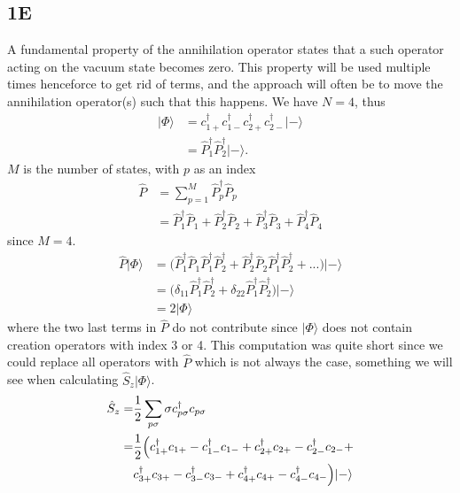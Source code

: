 \documentclass[norsk,a4paper,12pt]{article}
\begin{document}
\subsection*{1E}
A fundamental property of the annihilation operator states that a such operator acting on the vacuum state becomes zero. This property will be used multiple times henceforce to get rid of terms, and the approach will often be to move the annihilation operator(s) such that this happens. 
We have $N=4$, thus 
\begin{align}
|\Phi\rangle&=c_{1+}^{\dagger}c_{1-}^{\dagger}c_{2+}^{\dagger}c_{2-}^{\dagger}|-\rangle\\
&=\hat{P}_1^{\dagger}\hat{P}_2^{\dagger}|-\rangle.
\end{align}
$M$ is the number of states, with $p$ as an index
\begin{align}
\hat{P}&=\sum_{p=1}^M\hat{P}_p^{\dagger}\hat{P}_p\\
&=\hat{P}_1^{\dagger}\hat{P}_1+\hat{P}_2^{\dagger}\hat{P}_2+\hat{P}_3^{\dagger}\hat{P}_3+\hat{P}_4^{\dagger}\hat{P}_4
\end{align}
since $M=4$. 
\begin{align}
\hat{P}|\Phi\rangle&=\Big(\hat{P}_1^{\dagger}\hat{P}_1\hat{P}_1^{\dagger}\hat{P}_2^{\dagger}+\hat{P}_2^{\dagger}\hat{P}_2\hat{P}_1^{\dagger}\hat{P}_2^{\dagger}+...\Big)|-\rangle\\
&=\Big(\delta_{11}\hat{P}_1^{\dagger}\hat{P}_2^{\dagger}+\delta_{22}\hat{P}_1^{\dagger}\hat{P}_2^{\dagger}\Big)|-\rangle\\
&=2|\Phi\rangle
\end{align}
where the two last terms in $\hat{P}$ do not contribute since $|\Phi\rangle$ does not contain creation operators with index 3 or 4. This computation was quite short since we could replace all operators with $\hat{P}$ which is not always the case, something we will see when calculating $\hat{S}_z|\Phi\rangle$.
\begin{align}
\hat{S}_z=&\frac{1}{2}\sum_{p\sigma}\sigma c_{p\sigma}^{\dagger}c_{p\sigma}\\
=&\frac{1}{2}\Big(c_{1+}^{\dagger}c_{1+}-c_{1-}^{\dagger}c_{1-}+c_{2+}^{\dagger}c_{2+}-c_{2-}^{\dagger}c_{2-}+\notag\\
&c_{3+}^{\dagger}c_{3+}-c_{3-}^{\dagger}c_{3-}+c_{4+}^{\dagger}c_{4+}-c_{4-}^{\dagger}c_{4-}\Big)|-\rangle
\end{align}
\end{document}
